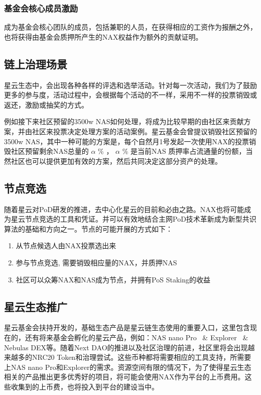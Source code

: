 \subsubsection{基金会核心成员激励}
成为基金会核心团队的成员，包括兼职的人员，在获得相应的工资作为报酬之外，也将获得由基金会质押所产生的NAX权益作为额外的贡献证明。


\subsection{链上治理场景}
星云生态中，会出现各种各样的评选和选举活动。针对每一次活动，我们为了鼓励更多的参与度，活动过程中，会根据每个活动的不一样，采用不一样的投票销毁或返还，激励或抽奖的方式。

例如接下来社区预留的3500w NAS如何处理，将成为比较早期的由社区来贡献方案，并由社区来投票决定处理方案的活动案例。星云基金会曾提议销毁社区预留的3500w NAS，其中一种可能的方案是，每个自然月1号发起一次使用NAX的投票销毁社区预留剩余NAS总量的 \(\alpha\) \% ， \(\alpha\) \% 是当前NAS 质押率占流通量的份额，当然社区也可以提供更加有效的方案，然后共同决定这部分资产的处理。

\subsection{节点竞选}
随着星云对PoD研发的推进，去中心化星云的目前和必由之路。NAX也将可能成为星云节点竞选的工具和凭证。并可以有效地结合主网PoD技术革新成为新型共识算法的基础和方向之一。节点的可能开展的方式如下：
\begin{enumerate}[\hspace{1cm}(a)]
  \item 从节点候选人由NAX投票选出来
  \item 参与节点竞选, 需要销毁相应量的NAX，并质押NAS
  \item 社区可以众筹NAX和NAS成为节点，并拥有PoS Staking的收益
\end{enumerate}

\subsection{星云生态推广}
星云基金会扶持开发的，基础生态产品是星云链生态使用的重要入口，这里包含现在的，还有将来基金会孵化的星云产品，例如：NAS nano Pro~\cite{NASnano} \& Explorer~\cite{explorer} \& Nebulas DEX等。随着Next DAO的推进以及社区治理的前进，社区里将会出现越来越多的NRC20 Token和治理尝试。这些币种都将需要相应的工具支持，所需要上NAS nano Pro和Explorer的需求。资源空间有限的情况下，为了使得星云生态相关的产品推出更多优秀好的项目，将可能会使用NAX作为平台的上币费用。这些收集到的上币费，也将投入到平台的建设当中。
